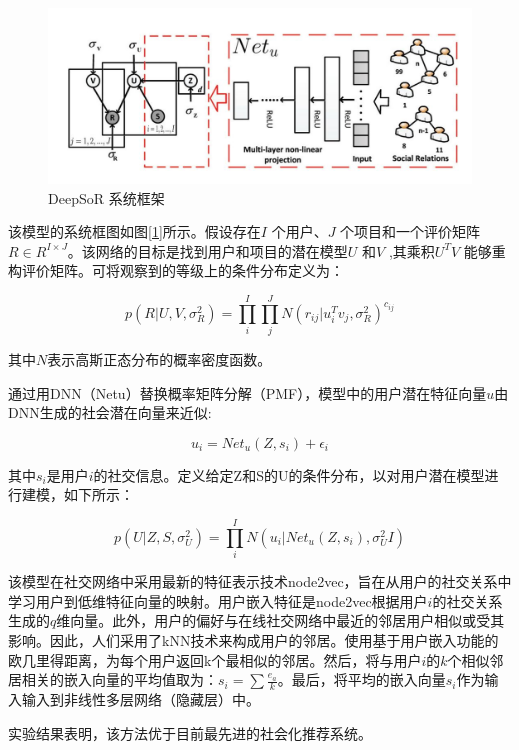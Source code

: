 \begin{figure}
    \includegraphics[width=0.9\linewidth]{dpfig/fig1.JPG}
    \caption{DeepSoR 系统框架}
    \label{fig1}
\end{figure}

该模型的系统框图如图\ref{1}所示。假设存在$I$ 个用户、$J$ 个项目和一个评价矩阵$R \in R^{I \times J}$。该网络的目标是找到用户和项目的潜在模型$U$ 和$V$ ,其乘积$U^TV$ 能够重构评价矩阵。可将观察到的等级上的条件分布定义为：

\begin{equation}
    p(R|U,V,\sigma_R^2) = \prod_i^I \prod_j^J N(r_{ij}|u_i^Tv_j, \sigma_R^2)^{c_{ij}}
\end{equation}

其中$N$表示高斯正态分布的概率密度函数。

通过用DNN（Netu）替换概率矩阵分解（PMF），模型中的用户潜在特征向量$u$由DNN生成的社会潜在向量来近似:

\begin{equation}
    u_i = Net_u(Z,s_i)+\epsilon_i 
\end{equation}

其中$s_i$是用户$i$的社交信息。定义给定Z和S的U的条件分布，以对用户潜在模型进行建模，如下所示：

\begin{equation}
    p(U|Z,S,\sigma_U^2) = \prod_i^I N(u_i|Net_u(Z,s_i),\sigma_U^2I)
\end{equation}

该模型在社交网络中采用最新的特征表示技术node2vec，旨在从用户的社交关系中学习用户到低维特征向量的映射。用户嵌入特征是node2vec根据用户$i$的社交关系生成的$q$维向量。此外，用户的偏好与在线社交网络中最近的邻居用户相似或受其影响。因此，人们采用了kNN技术来构成用户的邻居。使用基于用户嵌入功能的欧几里得距离，为每个用户返回k个最相似的邻居。然后，将与用户$i$的$k$个相似邻居相关的嵌入向量的平均值取为：$s_i=\sum \frac{e_a}{k}$。最后，将平均的嵌入向量$s_i$作为输入输入到非线性多层网络（隐藏层）中。

实验结果表明，该方法优于目前最先进的社会化推荐系统。

